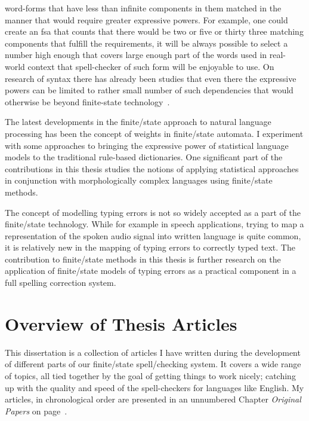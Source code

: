 \documentclass[officiallayout,final]{unihelcompling}
\begin{document}
word-forms that have less than infinite components in them matched in the
manner that would require greater expressive powers. For example, one could
create an \gls{fsa} that counts that there would be two or five or
thirty three matching components that fulfill the requirements, it will be
always possible to select a number high enough that covers large enough part of
the words used in real-world context that spell-checker of such form will be
enjoyable to use.  On research of syntax there has already been studies that
even there the expressive powers can be limited to rather small number of such
dependencies that would otherwise be beyond finite-state
technology~\citep{karlsson2007constraints}.

The latest developments in the finite\-/state approach to natural language
processing has been the concept of weights in finite\-/state automata.  I
experiment with some approaches to bringing the expressive power of
statistical language models to the traditional rule-based dictionaries. One
significant part of the contributions in this thesis studies the notions of
applying statistical approaches in conjunction with morphologically complex
languages using finite\-/state methods.

The concept of modelling typing errors is not so widely accepted as a part of
the finite\-/state technology. While for example in speech applications, trying
to map a representation of the spoken audio signal into written language is
quite common, it is relatively new in the mapping of typing errors to correctly
typed text. The contribution to finite\-/state methods in this thesis is
further research on the application of finite\-/state models of typing errors
as a practical component in a full spelling correction system.

\section{Overview of Thesis Articles}
\label{sec:articles}

This dissertation is a collection of articles I have written during the
development of different parts of our finite\-/state spell\-/checking system. It
covers a wide range of topics, all tied together by the goal of getting things
to work nicely; catching up with the quality and speed of the spell-checkers
for languages like English. My articles, in chronological order are presented
in an unnumbered Chapter \emph{Original Papers} on page~\pageref{chap:papers}.
\end{document}
